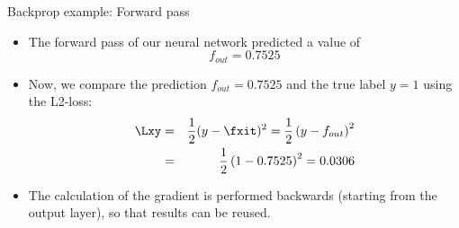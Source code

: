 \begin{vbframe}{Backprop example: Forward pass}
\framebreak
  \begin{itemize}
    \item The forward pass of our neural network predicted a value of $$f_{out} = 0.7525$$
    \item Now, we compare the prediction $f_{out} = 0.7525$ and the true label $y = 1$ using the L2-loss: 
      \begin{eqnarray*}
        \Lxy &=& \frac{1}{2}(y - \fxit)^2 = \frac{1}{2}\left(y - f_{out}\right)^{2} \\
                  &=& \frac{1}{2}\left(1 - \num[round-mode=places,round-precision=4]{0.7525469}\right)^2 = \num[round-mode=places,round-precision=4]{0.03061652}
      \end{eqnarray*}
    \item The calculation of the gradient is performed backwards (starting from the output layer), so that results can be reused. 
  \end{itemize}

  \end{vbframe}

